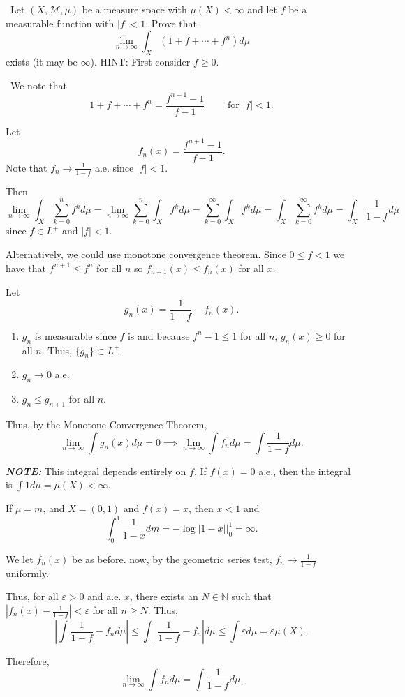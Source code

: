 \documentclass[12pt]{Homework}
\begin{document}
\begin{problem} $\,$
Let $(X,\mathscr{M},\mu)$ be a measure space with $\mu(X)<\infty$ and let $f$ be a measurable function with $|f|<1.$ Prove that $$\lim_{n\to\infty}\int_X(1+f+\cdots+f^n)d\mu$$ exists (it may be $\infty$). HINT: First consider $f\ge0$.
\end{problem}


\begin{solution}$\,$
We note that $$1+f+\cdots+f^n=\frac{f^{n+1}-1}{f-1}\qquad\text{ for }|f|<1.$$

Let $$f_n(x)=\frac{f^{n+1}-1}{f-1}.$$ Note that $f_n\to \frac{1}{1-f}$ a.e. since $|f|<1.$

 Then $$\lim_{n\to\infty}\int_X\sum_{k=0}^nf^kd\mu=\lim_{n\to\infty}\sum_{k=0}^n\int_Xf^kd\mu=\sum_{k=0}^\infty\int_Xf^kd\mu=\int_X\sum_{k=0}^\infty f^kd\mu=\int_X\frac{1}{1-f}d\mu$$ since $f\in L^+$ and $|f|<1.$

Alternatively, we could use monotone convergence theorem. Since $0\le f<1$ we have that $f^{n+1}\le f^n$ for all $n$ so $f_{n+1}(x)\le f_n(x)$ for all $x$.

Let $$g_n(x)=\frac{1}{1-f}-f_n(x).$$

\begin{enumerate}
    \item $g_n$ is measurable since $f$ is and because $f^n-1\le 1$ for all $n$, $g_n(x)\ge0$ for all $n.$ Thus, $\{g_n\}\subset L^+.$
    \item $g_n\to0$ a.e.
    \item $g_n\le g_{n+1}$ for all $n$.
\end{enumerate}

Thus, by the Monotone Convergence Theorem, $$\lim_{n\to\infty}\int g_n(x)d\mu=0\implies \lim_{n\to\infty}\int f_nd\mu=\int\frac{1}{1-f}d\mu.$$


\textbf{\textit{NOTE:}} This integral depends entirely on $f$. If $f(x)=0$ a.e., then the integral is $\int 1d\mu=\mu(X)<\infty.$

If $\mu=m$, and $X=(0,1)$ and $f(x)=x$, then $x<1$ and $$\int_0^1\frac{1}{1-x}dm=-\log|1-x|\bigg|_0^1=\infty.$$

 We let $f_n(x)$ be as before. now, by the geometric series test, $f_n\to\frac{1}{1-f}$ uniformly.

Thus, for all $\varepsilon>0$ and a.e. $x$, there exists an $N\in\mathbb{N}$ such that $|f_n(x)-\frac{1}{1-f}|<\varepsilon$ for all $n\ge N$. Thus, $$\left|\int\frac{1}{1-f}-f_nd\mu\right|\le\int\left|\frac{1}{1-f}-f_n\right|d\mu\le\int\varepsilon d\mu=\varepsilon \mu(X).$$

Therefore, $$\lim_{n\to\infty}\int f_nd\mu=\int\frac{1}{1-f}d\mu.$$
\end{solution}
\newpage
\end{document}
